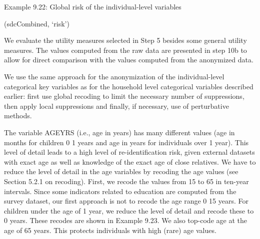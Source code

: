 \documentclass[letterpaper,10pt,english]{sphinxmanual}
\begin{document}
Example 9.22: Global risk of the individual-level variables

(sdcCombined, ‘risk’)

\begin{DUlineblock}{0em}
\item[] 
\item[] \sphinxcode{\sphinxupquote{\#\#}}
\item[] 
\item[] 
\item[] \sphinxcode{\sphinxupquote{\#\#}}
\item[] 
\item[] 
\end{DUlineblock}


We evaluate the utility measures selected in Step 5 besides some general
utility measures. The values computed from the raw data are presented in
step 10b to allow for direct comparison with the values computed from
the anonymized data.


We use the same approach for the anonymization of the individual-level
categorical key variables as for the household level categorical
variables described earlier: first use global recoding to limit the
necessary number of suppressions, then apply local suppressions and
finally, if necessary, use of perturbative methods.

The variable AGEYRS (i.e., age in years) has many different values (age
in months for children 0 \textendash{} 1 years and age in years for individuals over
1 year). This level of detail leads to a high level of re-identification
risk, given external datasets with exact age as well as knowledge of the
exact age of close relatives. We have to reduce the level of detail in
the age variables by recoding the age values (see Section 5.2.1 on
recoding). First, we recode the values from 15 to 65 in ten-year
intervals. Since some indicators related to education are computed from
the survey dataset, our first approach is not to recode the age range 0
\textendash{} 15 years. For children under the age of 1 year, we reduce the level of
detail and recode these to 0 years. These recodes are shown in Example
9.23. We also top-code age at the age of 65 years. This protects
individuals with high (rare) age values.
\end{document}
